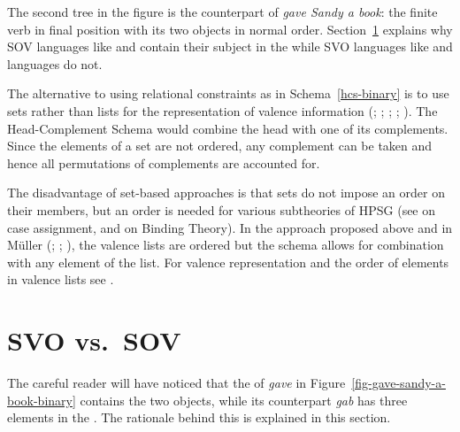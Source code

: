 \documentclass[output=paper
	        ,collection
	        ,collectionchapter
 	        ,biblatex
                ,babelshorthands
                ,newtxmath
                ,draftmode
                ,colorlinks, citecolor=brown
]{langscibook}
\begin{document}
The second tree in the figure is the  counterpart of \emph{gave Sandy a book}: the finite verb
in final position with its two objects in normal order. Section~\ref{sec-svo-sov} explains why SOV
languages like  and  contain their subject in the \compsl while SVO languages like
 and  languages do not.

The alternative to using relational constraints as in Schema~\ref{hcs-binary} is to use sets rather
than lists for the representation of valence information
(\citealp[Section~4]{Gunji86a}; \citealp[]{HN89a}; \citealp[]{Pollard90a-Eng};
\citealp[]{Oliva92b}; \citealp*[]{EEU92a}). The Head-Complement Schema would combine the head with
one of its complements. Since the elements of a set are not ordered, any complement can be taken and
hence all permutations of complements are accounted for.

The disadvantage of set-based approaches is that sets do
not impose an order on their members, but an order is needed for various subtheories of HPSG (see
 on case assignment, and  on Binding Theory). In
the approach proposed above and in Müller (\citeyear[]{Mueller2005c}; \citeyear[]{MuellerHPSGHandbook}; \citeyear[--54]{MuellerCoreGram}), the valence lists are
ordered but the schema allows for combination with any element of the list. For valence
representation and the order of elements in valence lists see .


\section{SVO vs.\ SOV}
\label{sec-svo-sov}

The careful reader will have noticed that the \compsl of \emph{gave} in Figure~\ref{fig-gave-sandy-a-book-binary} contains the
two objects, while its  counterpart \emph{gab} has three elements in the \compsl. The
rationale behind this is explained in this section.
\end{document}

